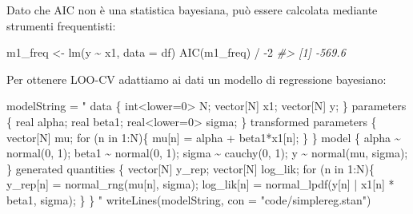 \documentclass[
  11pt,
]{krantz}
\makeatletter
\newenvironment{Shaded}{\begin{snugshade}}{\end{snugshade}}
\newcommand{\AttributeTok}[1]{\textcolor[rgb]{0.61,0.61,0.61}{#1}}
\newcommand{\CommentTok}[1]{\textcolor[rgb]{0.37,0.37,0.37}{\textit{#1}}}
\newcommand{\DecValTok}[1]{\textcolor[rgb]{0.06,0.06,0.06}{#1}}
\newcommand{\FunctionTok}[1]{\textcolor[rgb]{0,0,0}{#1}}
\newcommand{\NormalTok}[1]{#1}
\newcommand{\OtherTok}[1]{\textcolor[rgb]{0.37,0.37,0.37}{#1}}
\newcommand{\SpecialCharTok}[1]{\textcolor[rgb]{0,0,0}{#1}}
\newcommand{\StringTok}[1]{\textcolor[rgb]{0.5,0.5,0.5}{#1}}
\newenvironment{kframe}{%
\medskip{}
\setlength{\fboxsep}{.8em}
 \def\at@end@of@kframe{}%
 \ifinner\ifhmode%
  \def\at@end@of@kframe{\end{minipage}}%
  \begin{minipage}{\columnwidth}%
 \fi\fi%
 \def\FrameCommand##1{\hskip\@totalleftmargin \hskip-\fboxsep
 \colorbox{shadecolor}{##1}\hskip-\fboxsep
     \hskip-\linewidth \hskip-\@totalleftmargin \hskip\columnwidth}%
 \MakeFramed {\advance\hsize-\width
   \@totalleftmargin\z@ \linewidth\hsize
   \@setminipage}}%
 {\par\unskip\endMakeFramed%
 \at@end@of@kframe}
\renewenvironment{Shaded}{\begin{kframe}}{\end{kframe}}
\theoremstyle{definition}
\theoremstyle{definition}
\theoremstyle{definition}
\theoremstyle{definition}
\theoremstyle{remark}
\makeatother
\begin{document}
Dato che AIC non è una statistica bayesiana, può essere calcolata mediante strumenti frequentisti:

\begin{Shaded}
\begin{Highlighting}[]
\NormalTok{m1\_freq }\OtherTok{\textless{}{-}} \FunctionTok{lm}\NormalTok{(y }\SpecialCharTok{\textasciitilde{}}\NormalTok{ x1, }\AttributeTok{data =}\NormalTok{ df)}
\FunctionTok{AIC}\NormalTok{(m1\_freq) }\SpecialCharTok{/} \SpecialCharTok{{-}}\DecValTok{2}
\CommentTok{\#\textgreater{} [1] {-}569.6}
\end{Highlighting}
\end{Shaded}

Per ottenere LOO-CV adattiamo ai dati un modello di regressione bayesiano:

\begin{Shaded}
\begin{Highlighting}[]
\NormalTok{modelString }\OtherTok{=} \StringTok{"}
\StringTok{data \{}
\StringTok{  int\textless{}lower=0\textgreater{} N;}
\StringTok{  vector[N] x1;}
\StringTok{  vector[N] y;}
\StringTok{\}}
\StringTok{parameters \{}
\StringTok{  real alpha;}
\StringTok{  real beta1;}
\StringTok{  real\textless{}lower=0\textgreater{} sigma;}
\StringTok{\}}
\StringTok{transformed parameters \{}
\StringTok{  vector[N] mu;}
\StringTok{  for (n in 1:N)\{}
\StringTok{    mu[n] = alpha + beta1*x1[n];}
\StringTok{  \}}
\StringTok{\}}
\StringTok{model \{}
\StringTok{  alpha \textasciitilde{} normal(0, 1);}
\StringTok{  beta1 \textasciitilde{} normal(0, 1);}
\StringTok{  sigma \textasciitilde{} cauchy(0, 1);}
\StringTok{  y \textasciitilde{} normal(mu, sigma);}
\StringTok{\}}
\StringTok{generated quantities \{}
\StringTok{  vector[N] y\_rep;}
\StringTok{  vector[N] log\_lik;}
\StringTok{  for (n in 1:N)\{}
\StringTok{    y\_rep[n] = normal\_rng(mu[n], sigma);}
\StringTok{    log\_lik[n] = normal\_lpdf(y[n] | x1[n] * beta1, sigma);}
\StringTok{  \}}
\StringTok{\}}
\StringTok{"}
\FunctionTok{writeLines}\NormalTok{(modelString, }\AttributeTok{con =} \StringTok{"code/simplereg.stan"}\NormalTok{)}
\end{Highlighting}
\end{Shaded}

\begin{Shaded}
\end{Shaded}
\end{document}
